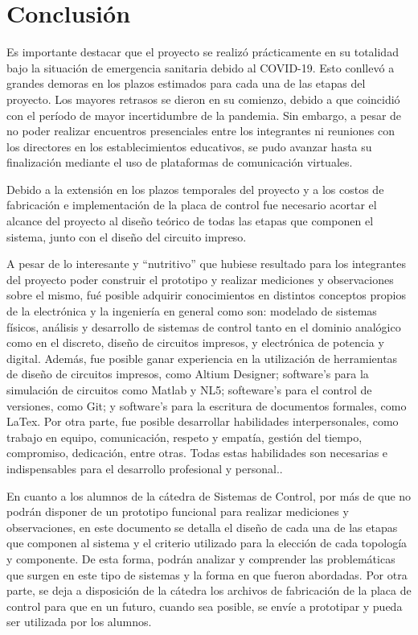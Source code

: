 \chapter{Conclusión}  \label{cap:Conclusión}

Es importante destacar que el proyecto se realizó prácticamente en su totalidad bajo la situación de emergencia sanitaria debido al COVID-19.  Esto conllevó a grandes demoras en los plazos estimados para cada una de las etapas del proyecto. Los mayores retrasos se dieron en su comienzo, debido a que coincidió con el período de mayor incertidumbre de la pandemia. Sin embargo, a pesar de no poder realizar encuentros presenciales entre los integrantes ni reuniones con los directores en los establecimientos educativos, se pudo avanzar hasta su finalización  mediante el uso de plataformas de comunicación virtuales.

Debido a la extensión en los plazos temporales del proyecto y a los costos de fabricación e implementación de la placa de control fue necesario acortar el alcance del proyecto al diseño teórico de todas las etapas que componen el sistema, junto con el diseño del circuito impreso.

A pesar de lo interesante y “nutritivo” que hubiese resultado para los integrantes del proyecto poder construir el prototipo y realizar mediciones y observaciones sobre el mismo, fué posible adquirir conocimientos en distintos conceptos propios de la electrónica y la ingeniería en general como son: modelado de sistemas físicos, análisis y desarrollo de sistemas de control tanto en el dominio analógico como en el discreto, diseño de circuitos impresos, y electrónica de potencia y digital. Además, fue posible ganar experiencia en la utilización de herramientas de diseño de circuitos impresos, como Altium Designer; software’s para la simulación de circuitos como Matlab y NL5; softeware’s para el control de versiones, como Git; y software’s para la escritura de documentos formales, como LaTex. Por otra parte, fue posible desarrollar habilidades interpersonales, como trabajo en equipo, comunicación, respeto y empatía, gestión del tiempo, compromiso, dedicación, entre otras. Todas estas habilidades son necesarias e indispensables para el desarrollo profesional y personal..

En cuanto a los alumnos de la cátedra de Sistemas de Control, por más de que no podrán disponer de un prototipo funcional para realizar mediciones y observaciones, en este documento se detalla el diseño de cada una de las etapas que componen al sistema y el criterio utilizado para la elección de cada topología y componente. De esta forma, podrán analizar y comprender las problemáticas que surgen en este tipo de sistemas y la forma en que fueron abordadas. Por otra parte, se deja a disposición de la cátedra  los archivos de fabricación de la placa de control para que en un futuro, cuando sea posible, se envíe a prototipar y pueda ser utilizada por los alumnos.
